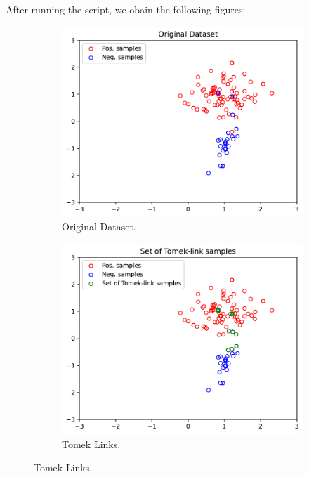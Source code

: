 \documentclass[a4paper]{article}
\begin{document}
{\begin{enumerate}
After running the script, we obain the following figures:
\begin{figure}[h]
    \centering
    \begin{subfigure}{0.32\textwidth}
        \centering
        \includegraphics[width=\textwidth]{figures/original_dataset}
        \caption{Original Dataset.}
    \end{subfigure}
    \hfill
    \begin{subfigure}{0.32\textwidth}
        \centering
        \includegraphics[width=\textwidth]{figures/tomek_links}
        \caption{Tomek Links.}
    \end{subfigure}

\end{figure}
\end{enumerate}}
\end{document}
